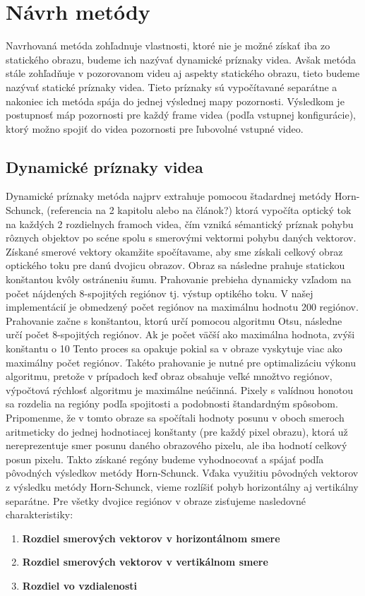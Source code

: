 \section{Návrh metódy}
Navrhovaná metóda zohľadnuje vlastnosti, ktoré nie je možné získať iba zo statického obrazu, budeme ich nazývať dynamické príznaky videa.
Avšak metóda stále zohľadňuje v pozorovanom videu aj aspekty statického obrazu, tieto budeme nazývať statické príznaky videa.
Tieto príznaky sú vypočítavané separátne a nakoniec ich metóda spája do jednej výslednej mapy pozornosti. Výsledkom je postupnosť máp pozornosti pre každý frame videa (podľa vstupnej konfigurácie), ktorý možno spojiť do videa pozornosti pre ľubovolné vstupné video.

\subsection{Dynamické príznaky videa}
Dynamické príznaky metóda najprv extrahuje pomocou štadardnej metódy Horn-Schunck, (referencia na 2 kapitolu alebo na článok?) ktorá vypočíta optický tok na každých 2 rozdielnych framoch videa, čím vzniká sémantický príznak pohybu rôznych objektov po scéne spolu s smerovými vektormi pohybu daných vektorov.
Získané smerové vektory okamžite spočítavame, aby sme získali celkový obraz optického toku pre danú dvojicu obrazov.
Obraz sa následne prahuje statickou konštantou kvôly ostráneniu šumu.
Prahovanie prebieha dynamicky vzľadom na počet nájdených 8-spojitých regiónov tj. výstup optikého toku. V našej implementácií je obmedzený počet regiónov na maximálnu hodnotu 200 regiónov.
Prahovanie začne s konštantou, ktorú určí pomocou algoritmu Otsu\cite{otsu}, následne určí počet 8-spojitých regiónov. Ak je počet väčší ako maximálna hodnota, zvýši konštantu o 10%
Tento proces sa opakuje pokial sa v obraze vyskytuje viac ako maximálny počet regiónov.
Takéto prahovanie je nutné pre optimalizáciu výkonu algoritmu, pretože v prípadoch keď obraz obsahuje veľké množtvo regiónov, výpočtová rýchlosť algoritmu je maximálne neúčinná.
Pixely s valídnou honotou sa rozdelia na regióny podľa spojitosti a podobnosti štandardným spôsobom.
Pripomenme, že v tomto obraze sa spočítali hodnoty posunu v oboch smeroch aritmeticky do jednej hodnotiacej konštanty (pre každý pixel obrazu), ktorá už nereprezentuje smer posunu daného obrazového pixelu, ale iba hodnotí celkový posun pixelu.
Takto získané regóny budeme vyhodnocovať a spájať podľa pôvodných výsledkov metódy Horn-Schunck.
Vďaka využitiu pôvodných vektorov z výsledku metódy Horn-Schunck, vieme rozlíšiť pohyb horizontálny aj vertikálny separátne.
Pre všetky dvojice regiónov v obraze zisťujeme nasledovné charakteristiky:
\begin{enumerate}
  \item\textbf{Rozdiel smerových vektorov v horizontálnom smere}
  \item\textbf{Rozdiel smerových vektorov v vertikálnom smere}
  \item\textbf{Rozdiel vo vzdialenosti}
\end{enumerate}
